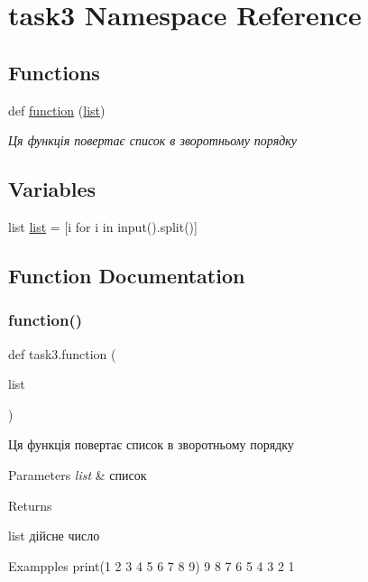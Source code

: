 \hypertarget{namespacetask3}{}\section{task3 Namespace Reference}
\label{namespacetask3}
\subsection*{Functions}
\begin{DoxyCompactItemize}
\item 
def \hyperlink{namespacetask3_a0e18a78d33848362e24638499627949f}{function} (\hyperlink{namespacetask3_a10c3530aba7287111f528047cf12d9e0}{list})
\begin{DoxyCompactList}\small\item\em Ця функція повертає список в зворотньому порядку \end{DoxyCompactList}\end{DoxyCompactItemize}
\subsection*{Variables}
\begin{DoxyCompactItemize}
\item 
list \hyperlink{namespacetask3_a10c3530aba7287111f528047cf12d9e0}{list} = \mbox{[}i for i in input().split()\mbox{]}
\end{DoxyCompactItemize}


\subsection{Function Documentation}
\mbox{\label{namespacetask3_a0e18a78d33848362e24638499627949f}} 
\subsubsection{\texorpdfstring{function()}{function()}}
{\footnotesize\ttfamily def task3.\+function (\begin{DoxyParamCaption}\item[{}]{list }\end{DoxyParamCaption})}



Ця функція повертає список в зворотньому порядку 


\begin{DoxyParams}{Parameters}
{\em list} & список\\
\hline
\end{DoxyParams}
\begin{DoxyReturn}{Returns}


list дійсне число
\end{DoxyReturn}
\begin{DoxyParagraph}{Exampples}
print(1 2 3 4 5 6 7 8 9) 9 8 7 6 5 4 3 2 1 
\end{DoxyParagraph}


